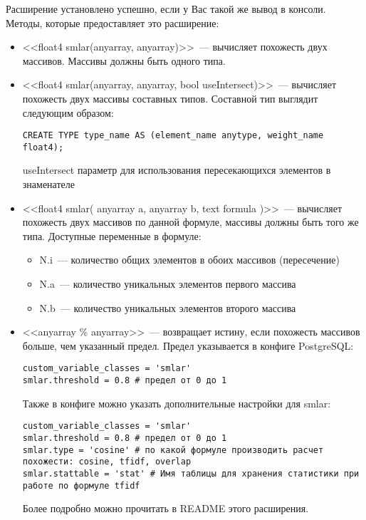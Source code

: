 Расширение установлено успешно, если у Вас такой же вывод в консоли. Методы, которые предоставляет это расширение:

\begin{itemize}
\item <<float4 smlar(anyarray, anyarray)>>~--- вычисляет похожесть двух массивов. Массивы должны быть одного типа.
\item <<float4 smlar(anyarray, anyarray, bool useIntersect)>>~--- вычисляет похожесть двух массивы составных типов. Составной тип выглядит следующим образом:
\begin{lstlisting}[label=lst:smlar5,caption=Составной тип]
CREATE TYPE type_name AS (element_name anytype, weight_name float4);
\end{lstlisting}
useIntersect параметр для использования пересекающихся элементов в знаменателе
\item <<float4 smlar( anyarray a, anyarray b, text formula )>>~--- вычисляет похожесть двух массивов по данной формуле, массивы должны быть того же типа. Доступные переменные в формуле:
  \begin{itemize}
    \item N.i~--- количество общих элементов в обоих массивов (пересечение)
    \item N.a~--- количество уникальных элементов первого массива
    \item N.b~--- количество уникальных элементов второго массива
  \end{itemize}
\item <<anyarray \% anyarray>>~--- возвращает истину, если похожесть массивов больше, чем указанный предел. Предел указывается в конфиге PostgreSQL:
\begin{lstlisting}[label=lst:smlar6,caption=Smlar предел]
custom_variable_classes = 'smlar'
smlar.threshold = 0.8 # предел от 0 до 1
\end{lstlisting}

Также в конфиге можно указать дополнительные настройки для smlar:
\begin{lstlisting}[label=lst:smlar7,caption=Smlar настройки]
custom_variable_classes = 'smlar'
smlar.threshold = 0.8 # предел от 0 до 1
smlar.type = 'cosine' # по какой формуле производить расчет похожести: cosine, tfidf, overlap
smlar.stattable = 'stat' # Имя таблицы для хранения статистики при работе по формуле tfidf
\end{lstlisting}

Более подробно можно прочитать в README этого расширения.
\end{itemize}

